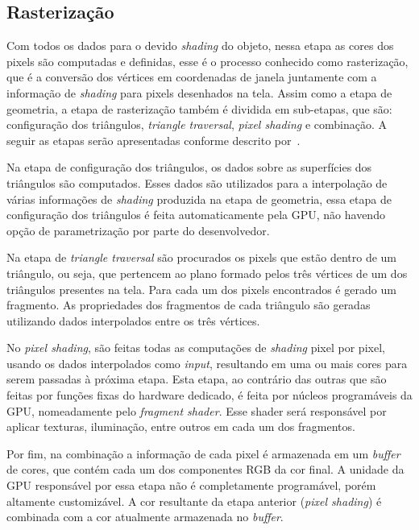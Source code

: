 \subsection{Rasterização}

Com todos os dados para o devido \textit{shading} do objeto, nessa etapa as cores dos 
pixels são computadas e definidas, esse é o processo conhecido como rasterização, que é 
a conversão dos vértices em coordenadas de janela juntamente com a informação de 
\textit{shading} para pixels desenhados na tela.
Assim como a etapa de geometria, a etapa de rasterização também é dividida em sub-etapas, 
que são: configuração dos triângulos, \textit{triangle traversal}, \textit{pixel shading} 
e combinação. A seguir as etapas serão apresentadas conforme descrito 
por~\cite{akenine2008real}.

Na etapa de configuração dos triângulos, os dados sobre as superfícies dos triângulos 
são computados. Esses dados são utilizados para a interpolação de várias informações 
de \textit{shading} produzida na etapa de geometria, essa etapa de configuração dos 
triângulos é feita automaticamente pela GPU, não havendo opção de parametrização por 
parte do desenvolvedor.

Na etapa de \textit{triangle traversal} são procurados os pixels que estão dentro de 
um triângulo, ou seja, que pertencem ao plano formado pelos três vértices de um dos 
triângulos presentes na tela. Para cada um dos pixels encontrados é gerado um 
fragmento. As propriedades dos fragmentos de cada triângulo são geradas utilizando 
dados interpolados entre os três vértices.

No \textit{pixel shading}, são feitas todas as computações de \textit{shading} pixel 
por pixel, usando os dados interpolados como \textit{input}, resultando em uma ou mais cores 
para serem passadas à próxima etapa. Esta etapa, ao contrário das outras que são 
feitas por funções fixas do hardware dedicado, é feita por núcleos programáveis da 
GPU, nomeadamente pelo \textit{fragment shader}. Esse shader será responsável por 
aplicar texturas, iluminação, entre outros em cada um dos fragmentos.

Por fim, na combinação a informação de cada pixel é armazenada em um \textit{buffer} 
de cores, que contém cada um dos componentes RGB da cor final. A unidade da GPU 
responsável por essa etapa não é completamente programável, porém altamente 
customizável.
A cor resultante da etapa anterior (\textit{pixel shading}) é combinada com a cor 
atualmente armazenada no \textit{buffer}.

